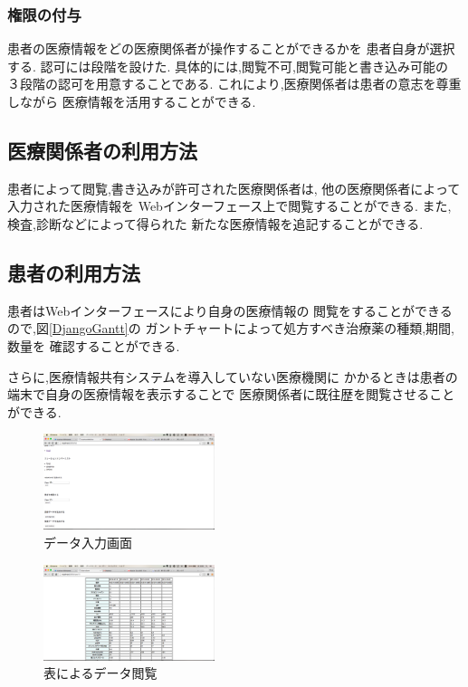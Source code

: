   \subsubsection{権限の付与}
    患者の医療情報をどの医療関係者が操作することができるかを
    患者自身が選択する.
    認可には段階を設けた.
    具体的には,閲覧不可,閲覧可能と書き込み可能の
    ３段階の認可を用意することである.
    これにより,医療関係者は患者の意志を尊重しながら
    医療情報を活用することができる.

\subsection{医療関係者の利用方法}
  患者によって閲覧,書き込みが許可された医療関係者は,
  他の医療関係者によって入力された医療情報を
  Webインターフェース上で閲覧することができる.
  また,検査,診断などによって得られた
  新たな医療情報を追記することができる.

\subsection{患者の利用方法}
  患者はWebインターフェースにより自身の医療情報の
  閲覧をすることができるので,図\ref{DjangoGantt}の
  ガントチャートによって処方すべき治療薬の種類,期間,数量を
  確認することができる.

  さらに,医療情報共有システムを導入していない医療機関に
  かかるときは患者の端末で自身の医療情報を表示することで
  医療関係者に既往歴を閲覧させることができる.


    \begin{figure}[htbp]
        \includegraphics[width=5cm, bb=0 0 437 688]{./gazou/DjangoFileio.png}
      \caption{データ入力画面}
      \label{DjangoFileio}
    \end{figure}

    \begin{figure}[htbp]
        \includegraphics[width=5cm, bb=0 0 437 688]{./gazou/DjangoTable.png}
      \caption{表によるデータ閲覧}
      \label{DjangoTable}
    \end{figure}

